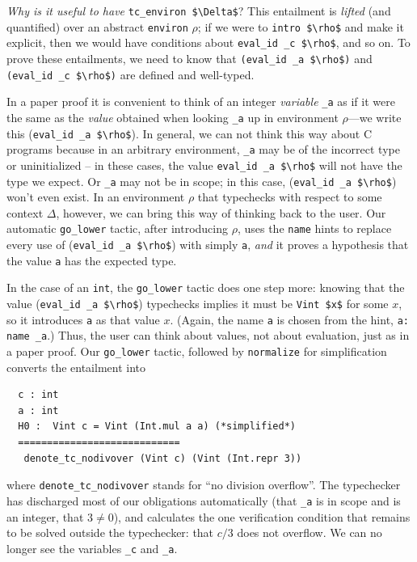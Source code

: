 \documentclass{puthesis}
\begin{document}
\emph{Why is it useful to have} \lstinline{tc_environ $\Delta$}?
This entailment is \emph{lifted} (and quantified) over an abstract
\lstinline|environ| $\rho$; if we were to \lstinline|intro $\rho$| and make it
explicit, then we would have conditions about \lstinline{eval_id _c $\rho$},
and so on.  
To prove these entailments, we need to know that
\lstinline{(eval_id _a $\rho$)}  and 
\lstinline{(eval_id _c $\rho$)}  are defined and well-typed.

In a paper proof it is convenient to think of an integer
\emph{variable} \lstinline{_a} as if it were the same as the
\emph{value} obtained when looking \lstinline{_a} up in environment
$\rho$---we write this (\lstinline|eval_id _a $\rho$|). In general, we
can not think this way about C programs because in an arbitrary
environment, \lstinline|_a| may be of the incorrect type or
uninitialized -- in these cases, the value 
\lstinline|eval_id _a $\rho$| will not have the type we expect.  Or \lstinline|_a| may not
be in scope; in this case, (\lstinline|eval_id _a $\rho$|) won't even exist. In
an environment $\rho$ that typechecks with respect to some context
$\Delta$, however, we can bring this way of thinking back to the user.
Our automatic \lstinline|go_lower| tactic, after introducing $\rho$,
uses the \lstinline{name} hints to replace every use of
(\lstinline|eval_id _a $\rho$|) with simply \lstinline{a}, \emph{and}
it proves a hypothesis that the value \lstinline|a| has the expected
type.  

In the case of an \lstinline{int}, the \lstinline|go_lower| tactic does one step more:
knowing that the value (\lstinline|eval_id _a $\rho$|) typechecks
implies it must be \lstinline|Vint $x$| for some $x$, so it introduces
\lstinline|a| as that value $x$.  (Again, the name \lstinline|a| is
chosen from the hint, \lstinline|a: name _a|.)  Thus, the user can
think about values, not about evaluation, just as in a paper proof.
Our \lstinline|go_lower| tactic, followed by \lstinline|normalize| for
simplification converts the entailment into

\begin{lstlisting}
  c : int
  a : int
  H0 :  Vint c = Vint (Int.mul a a) (*simplified*)
  ============================
   denote_tc_nodivover (Vint c) (Vint (Int.repr 3))
\end{lstlisting}
where \lstinline|denote_tc_nodivover| stands for ``no division
overflow''. The typechecker has discharged most of our obligations
automatically (that \lstinline|_a| is in scope and is an integer, that
$3 \neq 0$),
and calculates the one verification condition that remains to be
solved outside the typechecker: that $c/3$ does not overflow.  We can no longer see the
variables \lstinline|_c| and \lstinline|_a|.
\end{document}
